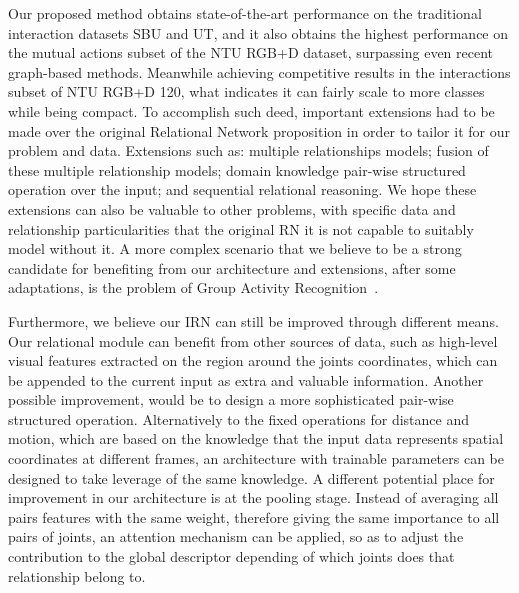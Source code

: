 \documentclass[journal,twoside]{IEEEtran}
\begin{document}
Our proposed method obtains state-of-the-art performance on the traditional interaction datasets SBU and UT, and it also obtains the highest performance on the mutual actions subset of the NTU RGB+D dataset, surpassing even recent graph-based methods.
Meanwhile achieving competitive results in the interactions subset of NTU RGB+D 120, what indicates it can fairly scale to more classes while being compact.
To accomplish such deed, important extensions had to be made over the original Relational Network proposition in order to tailor it for our problem and data.
Extensions such as: multiple relationships models; fusion of these multiple relationship models; domain knowledge pair-wise structured operation over the input; and sequential relational reasoning.
We hope these extensions can also be valuable to other problems, with specific data and relationship particularities that the original RN it is not capable to suitably model without it.
A more complex scenario that we believe to be a strong candidate for benefiting from our architecture and extensions, after some adaptations, is the problem of Group Activity Recognition~\cite{Ibrahim2016,Ibrahim2018}.

Furthermore, we believe our IRN can still be improved through different means.
Our relational module can benefit from other sources of data, such as high-level visual features extracted on the region around the joints coordinates, which can be appended to the current input as extra and valuable information.
Another possible improvement, would be to design a more sophisticated pair-wise structured operation. Alternatively to the fixed operations for distance and motion, which are based on the knowledge that the input data represents spatial coordinates at different frames, an architecture with trainable parameters can be designed to take leverage of the same knowledge.
A different potential place for improvement in our architecture is at the pooling stage. Instead of averaging all pairs features with the same weight, therefore giving the same importance to all pairs of joints, an attention mechanism can be applied, so as to adjust the contribution to the global descriptor depending of which joints does that relationship belong to.


 
\end{document}
